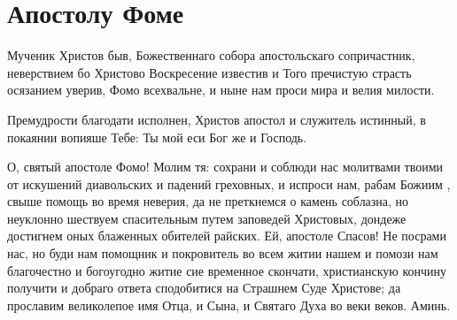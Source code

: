 \section{Апостолу Фоме}\begin{mymulticols}


Мученик Христов быв, Божественнаго собора апостольскаго сопричастник, неверствием бо Христово Воскресение известив и Того пречистую страсть осязанием уверив, Фомо всехвальне, и ныне нам проси мира и велия милости.


Премудрости благодати исполнен, Христов апостол и служитель истинный, в покаянии вопияше Тебе: Ты мой еси Бог же и Господь.


О, святый апостоле Фомо! Молим тя: сохрани и соблюди нас молитвами твоими от искушений диавольских и падений греховных, и испроси нам, рабам Божиим , свыше помощь во время неверия, да не преткнемся о камень соблазна, но неуклонно шествуем спасительным путем заповедей Христовых, дондеже достигнем оных блаженных обителей райских. Ей, апостоле Спасов! Не посрами нас, но буди нам помощник и покровитель во всем житии нашем и помози нам благочестно и богоугодно житие сие временное скончати, христианскую кончину получити и добраго ответа сподобитися на Страшнем Суде Христове; да прославим великолепое имя Отца, и Сына, и Святаго Духа во веки веков. Аминь.

\end{mymulticols}

\mychapterending


